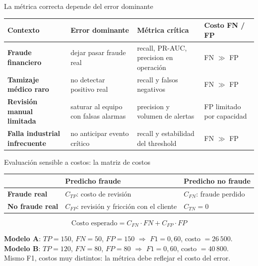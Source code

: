 \documentclass[aspectratio=169,12pt]{beamer}
\newcommand{\hrow}{\rowcolor{mlcream}}
\begin{document}
\begin{frame}{La métrica correcta depende del error dominante}
  \centering\small
  \begin{tabular}{@{}l L{0.22\textwidth} L{0.24\textwidth} L{0.16\textwidth}@{}}
    \toprule
    \hrow \textbf{Contexto} & Error dominante & Métrica crítica & Costo FN / FP \\
    \midrule
    \textbf{Fraude financiero} & dejar pasar fraude real & recall, PR-AUC, precision en operación & FN $\gg$ FP \\
    \textbf{Tamizaje médico raro} & no detectar positivo real & recall y falsos negativos & FN $\gg$ FP \\
    \textbf{Revisión manual limitada} & saturar al equipo con falsas alarmas & precision y volumen de alertas & FP limitado por capacidad \\
    \textbf{Falla industrial infrecuente} & no anticipar evento crítico & recall y estabilidad del threshold & FN $\gg$ FP \\
    \bottomrule
  \end{tabular}
\end{frame}

\begin{frame}{Evaluación sensible a costos: la matriz de costos}
  \centering\small
  \begin{tabular}{@{}l L{0.3\textwidth} L{0.3\textwidth}@{}}
    \toprule
    \hrow & Predicho fraude & Predicho no fraude \\
    \midrule
    \textbf{Fraude real} & $C_{TP}$: costo de revisión & $C_{FN}$: fraude perdido \\
    \textbf{No fraude real} & $C_{FP}$: revisión y fricción con el cliente & $C_{TN} = 0$ \\
    \bottomrule
  \end{tabular}
  \[ \text{Costo esperado} = C_{FN}\cdot FN + C_{FP}\cdot FP \]
  \raggedright
  \begin{examplebox}[$C_{FN} = 500$, $C_{FP} = 10$ (USD), 200 fraudes]
    \footnotesize
    \textbf{Modelo A}: $TP = 150$, $FN = 50$, $FP = 150$ $\Rightarrow$ $F1 = 0{,}60$, costo $= 26\,500$.\\
    \textbf{Modelo B}: $TP = 120$, $FN = 80$, $FP = 80$ $\Rightarrow$ $F1 = 0{,}60$, costo $= 40\,800$.\\
    Mismo F1, costos muy distintos: la métrica debe reflejar el costo del error.
  \end{examplebox}
\end{frame}
\end{document}
